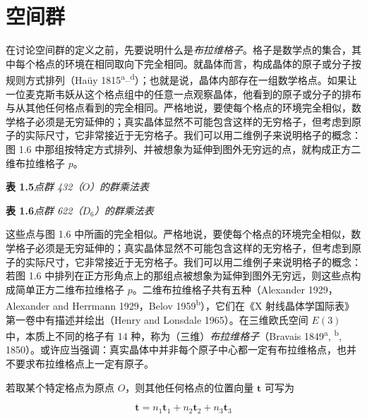 \section{空间群}

在讨论空间群的定义之前，先要说明什么是\textit{布拉维格子}。格子是数学点的集合，其中每个格点的环境在相同取向下完全相同。就晶体而言，构成晶体的原子或分子按规则方式排列（Haüy 1815\textsuperscript{a}–\textsuperscript{d}）；也就是说，晶体内部存在一组数学格点。如果让一位麦克斯韦妖从这个格点组中的任意一点观察晶体，他看到的原子或分子的排布与从其他任何格点看到的完全相同。严格地说，要使每个格点的环境完全相似，数学格子必须是无穷延伸的；真实晶体显然不可能包含这样的无穷格子，但考虑到原子的实际尺寸，它非常接近于无穷格子。我们可以用二维例子来说明格子的概念：图 1.6 中那组按特定方式排列、并被想象为延伸到图外无穷远的点，就构成正方二维布拉维格子 $p$。

\textbf{表 1.5}\quad \textit{点群 432（$O$）的群乘法表}



\textbf{表 1.6}\quad \textit{点群 622（$D_{6}$）的群乘法表}



这些点与图 1.6 中所画的完全相似。严格地说，要使每个格点的环境完全相似，数学格子必须是无穷延伸的；真实晶体显然不可能包含这样的无穷格子，但考虑到原子的实际尺寸，它非常接近于无穷格子。我们可以用二维例子来说明格子的概念：若图 1.6 中排列在正方形角点上的那组点被想象为延伸到图外无穷远，则这些点构成简单正方二维布拉维格子 $p$。二维布拉维格子共有五种（Alexander 1929，Alexander and Herrmann 1929，Belov 1959\textsuperscript{b}），它们在《X 射线晶体学国际表》第一卷中有描述并绘出（Henry and Lonsdale 1965）。在三维欧氏空间 $E(3)$ 中，本质上不同的格子有 14 种，称为（三维）\textit{布拉维格子}（Bravais 1849\textsuperscript{a}, \textsuperscript{b}, 1850）。或许应当强调：真实晶体中并非每个原子中心都一定有布拉维格点，也并不要求布拉维格点上一定有原子。

若取某个特定格点为原点 $O$，则其他任何格点的位置向量 $\mathbf{t}$ 可写为

\begin{equation*}
\mathbf{t} = n_{1}\mathbf{t}_{1} + n_{2}\mathbf{t}_{2} + n_{3}\mathbf{t}_{3}
\tag{1.5.1}
\end{equation*}


